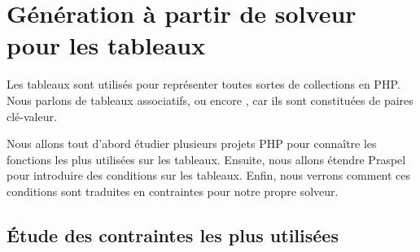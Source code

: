 \section{Génération à partir de solveur pour les tableaux}
\label{section:data:arrays}

Les tableaux sont utilisés pour représenter toutes sortes de collections en PHP.
Nous parlons de tableaux associatifs, ou encore , car ils
sont constituées de paires clé-valeur.

Nous allons tout d'abord étudier plusieurs projets PHP pour connaître les
fonctions les plus utilisées sur les tableaux. Ensuite, nous allons étendre
Praspel pour introduire des conditions sur les tableaux. Enfin, nous verrons
comment ces conditions sont traduites en contraintes pour notre propre solveur.

\subsection{Étude des contraintes les plus utilisées}

